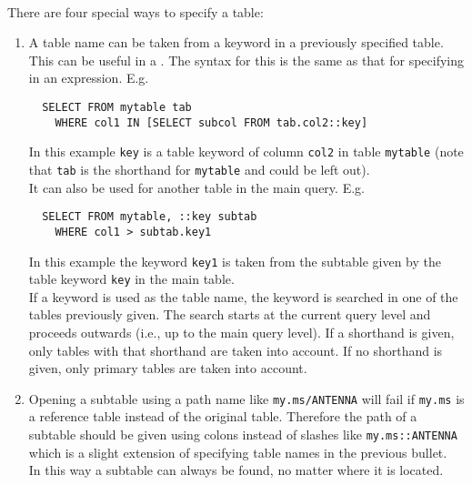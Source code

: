 \paragraph*{}
There are four special ways to specify a table:
\begin{enumerate}

\item
A table name can be taken from a keyword in a previously
specified table. This can be useful in a
. The syntax for this is
the same as that for specifying 
in an expression. E.g.
\begin{verbatim}
  SELECT FROM mytable tab
    WHERE col1 IN [SELECT subcol FROM tab.col2::key]
\end{verbatim}
In this example \texttt{key} is a table keyword of column
\texttt{col2} in table \texttt{mytable} (note that \texttt{tab}
is the shorthand for \texttt{mytable} and could be left out).
\\It can also be used for another table in the main query. E.g.
\begin{verbatim}
  SELECT FROM mytable, ::key subtab
    WHERE col1 > subtab.key1
\end{verbatim}
In this example the keyword \texttt{key1} is taken from the
subtable given by the table keyword \texttt{key} in the main
table.
\\If a keyword is used as the table name, the keyword is
searched
in one of the tables previously given. The search starts at
the current query level and proceeds outwards (i.e., up to the
main query level). If a shorthand is given, only tables with
that shorthand are taken into account. If no shorthand is
given, only primary tables are taken into account.

\item
Opening a subtable using a path name like \texttt{my.ms/ANTENNA}
will fail if \texttt{my.ms} is a reference table instead of the
original table.
Therefore the path of a subtable should be given using colons instead of
slashes like \texttt{my.ms::ANTENNA} which is a slight extension of
specifying table names in the previous bullet.
\\In this way a subtable can always be found, no matter where it is located.


\end{enumerate}
